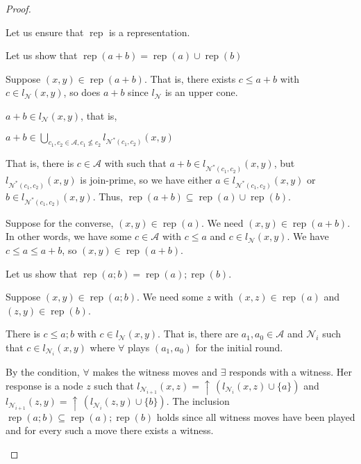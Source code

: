 \documentclass[a4paper]{article}
\theoremstyle{definition}
\theoremstyle{theorem}
\theoremstyle{proposition}
\theoremstyle{lemma}
\theoremstyle{ex}
\theoremstyle{corollary}
\theoremstyle{claim}
\newcommand{\up}[1]{\ensuremath{{\uparrow}\,#1}}
\begin{document}
\begin{proof}
\begin{enumerate}
    Let us ensure that $\operatorname{rep}$ is a representation.

Let us show that $\operatorname{rep}(a + b) = \operatorname{rep}(a) \cup \operatorname{rep}(b)$

Suppose $(x, y) \in \operatorname{rep}(a + b)$. That is, there exists $c \leq a + b$ with $c \in l_{\mathcal{N}}(x, y)$, so does $a + b$ since $l_{\mathcal{N}}$ is an upper cone.

$a + b \in l_{\mathcal{N}}(x, y)$, that is,

\begin{center}
$a + b \in \bigcup \limits_{ c_1, c_2 \in \mathcal{A}, c_1 \not\leq c_2} l_{\mathcal{N}^{*}(c_1, c_2)}(x,y)$
\end{center}

That is, there is $c \in \mathcal{A}$ with such that $a + b \in l_{\mathcal{N}^{*}(c_1, c_2)}(x,y)$, but $l_{\mathcal{N}^{*}(c_1, c_2)}(x,y)$ is join-prime, so we have either $a \in l_{\mathcal{N}^{*}(c_1, c_2)}(x,y)$ or $b \in l_{\mathcal{N}^{*}(c_1, c_2)}(x,y)$. Thus, $\operatorname{rep}(a + b) \subseteq \operatorname{rep}(a) \cup \operatorname{rep}(b)$.

Suppose for the converse, $(x, y) \in \operatorname{rep}(a)$. We need $(x, y) \in \operatorname{rep}(a + b)$.
In other words, we have some $c \in \mathcal{A}$ with $c \leq a$ and $c \in l_{\mathcal{N}}(x, y)$.
We have $c \leq a \leq a + b$, so $(x, y) \in \operatorname{rep}(a + b)$.

Let us show that $\operatorname{rep}(a ; b) = \operatorname{rep}(a) ; \operatorname{rep}(b)$.

Suppose $(x, y) \in \operatorname{rep}(a ; b)$. We need some $z$ with $(x, z) \in \operatorname{rep}(a)$ and $(z, y) \in \operatorname{rep}(b)$.

There is $c \leq a ; b$ with $c \in l_{\mathcal{N}}(x,y)$. That is, there are $a_1, a_0 \in \mathcal{A}$ and $\mathcal{N}_i$ such that $c \in l_{\mathcal{N}_i}(x, y)$ where $\forall$ plays $(a_1, a_0)$ for the initial round.

By the condition, $\forall$ makes the witness moves and $\exists$ responds with a witness. Her response is a node $z$ such that $l_{\mathcal{N}_{i + 1}}(x, z) =  \up{(l_{\mathcal{N}_i}(x, z) \cup \{ a \})}$ and $l_{\mathcal{N}_{i + 1}}(z, y) = \up{(l_{\mathcal{N}_i}(z, y) \cup \{ b\})}$.
The inclusion $\operatorname{rep}(a ; b) \subseteq \operatorname{rep}(a) ; \operatorname{rep}(b)$ holds since all witness moves have been played and for every such a move there exists a witness.


\end{enumerate}
\end{proof}
\end{document}

